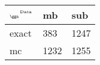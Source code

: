 \begin{tabular}{lll}
    \toprule
    $_{\text{\tiny{\ggn}}}$$^{\text{\tiny{Data}}}$ & mb & sub \\
    \midrule
    exact & 383
              & 1247 \\
    mc   & 1232
              & 1255 \\
    \bottomrule
\end{tabular}